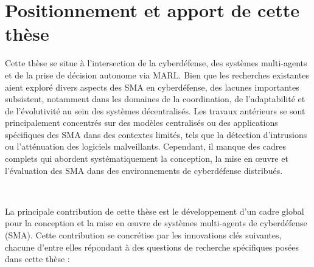 \section{Positionnement et apport de cette thèse}

Cette thèse se situe à l'intersection de la cyberdéfense, des systèmes multi-agents et de la prise de décision autonome via MARL. Bien que les recherches existantes aient exploré divers aspects des SMA en cyberdéfense, des lacunes importantes subsistent, notamment dans les domaines de la coordination, de l'adaptabilité et de l'évolutivité au sein des systèmes décentralisés. Les travaux antérieurs se sont principalement concentrés sur des modèles centralisés ou des applications spécifiques des SMA dans des contextes limités, tels que la détection d'intrusions ou l'atténuation des logiciels malveillants. Cependant, il manque des cadres complets qui abordent systématiquement la conception, la mise en œuvre et l'évaluation des SMA dans des environnements de cyberdéfense distribués.

\

La principale contribution de cette thèse est le développement d'un cadre global pour la conception et la mise en œuvre de systèmes multi-agents de cyberdéfense (SMA). Cette contribution se concrétise par les innovations clés suivantes, chacune d'entre elles répondant à des questions de recherche spécifiques posées dans cette thèse :


